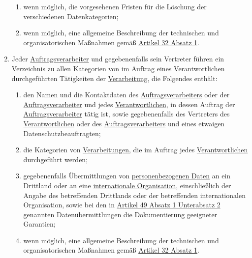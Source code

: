 \begin{enumerate}
\begin{enumerate}
    \item wenn möglich, die vorgesehenen Fristen für die Löschung der verschiedenen Datenkategorien;
    \label{itm:30-1f}

    \item wenn möglich, eine allgemeine Beschreibung der technischen und organisatorischen Maßnahmen gemäß
     \hyperref[itm:32-1]{Artikel 32 Absatz 1}.
    \label{itm:30-1g}

  \end{enumerate}

  \item Jeder \hyperref[itm:04-8]{Auftragsverarbeiter} und gegebenenfalls sein Vertreter führen ein Verzeichnis zu allen Kategorien von im
   Auftrag eines \hyperref[itm:04-7]{Verantwortlichen} durchgeführten Tätigkeiten der \hyperref[itm:04-2]{Verarbeitung}, die Folgendes enthält:
  \label{itm:30-2}

  \begin{enumerate}
  
    \item den Namen und die Kontaktdaten des \hyperref[itm:04-8]{Auftragsverarbeiters} oder der \hyperref[itm:04-8]{Auftragsverarbeiter} und jedes
     \hyperref[itm:04-7]{Verantwortlichen}, in dessen Auftrag der \hyperref[itm:04-8]{Auftragsverarbeiter} tätig ist, sowie gegebenenfalls des Vertreters des
     \hyperref[itm:04-7]{Verantwortlichen} oder des \hyperref[itm:04-8]{Auftragsverarbeiters} und eines etwaigen Datenschutzbeauftragten;
    \label{itm:30-2a}

    \item die Kategorien von \hyperref[itm:04-2]{Verarbeitungen}, die im Auftrag jedes \hyperref[itm:04-7]{Verantwortlichen} durchgeführt werden;
    \label{itm:30-2b}

    \item gegebenenfalls Übermittlungen von \hyperref[itm:04-1]{personenbezogenen Daten} an ein Drittland oder an eine \hyperref[itm:04-29]{internationale
     Organisation}, einschließlich der Angabe des betreffenden Drittlands oder der betreffenden internationalen
     Organisation, sowie bei den in \hyperref[itm:49-1-2]{Artikel 49 Absatz 1 Unterabsatz 2} genannten
     Datenübermittlungen die Dokumentierung geeigneter Garantien;
    \label{itm:30-2c}

    \item wenn möglich, eine allgemeine Beschreibung der technischen und organisatorischen Maßnahmen gemäß \hyperref
     [itm:32-1]{Artikel 32 Absatz 1}.
    \label{itm:30-2d}


\end{enumerate}
\end{enumerate}
